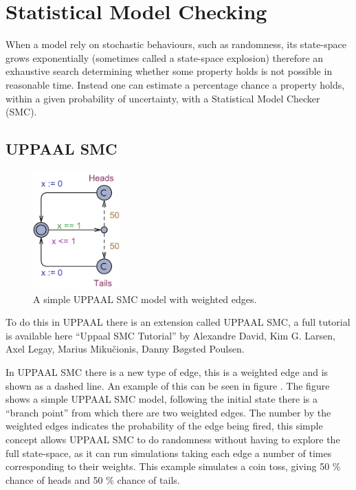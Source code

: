 \newpage
\section{Statistical Model Checking}
When a model rely on stochastic behaviours, such as randomness, its state-space grows exponentially (sometimes called a state-space explosion) therefore an exhaustive search determining whether some property holds is not possible in reasonable time. 
Instead one can estimate a percentage chance a property holds, within a given probability of uncertainty, with a Statistical Model Checker (SMC). 

\subsection{UPPAAL SMC}\label{subsec:uppaalsmc}
\begin{figure}
\centering
  \includegraphics[width=0.3\textwidth]{Figures/Model/Simple_SMC.pdf} 
\caption{A simple UPPAAL SMC model with weighted edges.}
\label{fig:simpleSMC}
\end{figure}

To do this in UPPAAL there is an extension called UPPAAL SMC, a full tutorial is available here ``Uppaal SMC Tutorial''\cite{DBLP:journals/sttt/DavidLLMP15} by Alexandre David, Kim G. Larsen, Axel Legay, Marius Miku\v{c}ionis, Danny B\o gsted Poulsen.

In UPPAAL SMC there is a new type of edge, this is a weighted edge and is shown as a dashed line. 
An example of this can be seen in figure . 
The figure shows a simple UPPAAL SMC model, following the initial state there is a ``branch point'' from which there are two weighted edges.
The number by the weighted edges indicates the probability of the edge being fired, this simple concept allows UPPAAL SMC to do randomness without having to explore the full state-space, as it can run simulations taking each edge a number of times corresponding to their weights. 
This example simulates a coin toss, giving 50 \% chance of heads and 50 \% chance of tails. 

